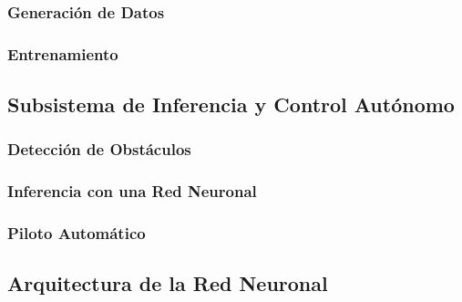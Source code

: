 \documentclass[]{beamer}
\begin{document}
            \subsubsection*{Generación de Datos}
            \begin{frame}
            \end{frame}

            \subsubsection*{Entrenamiento}
            \begin{frame}
            \end{frame}

        \subsection{Subsistema de Inferencia y Control Autónomo}
        \begin{frame}
        \end{frame}

            \subsubsection*{Detección de Obstáculos}
            \begin{frame}
            \end{frame}

            \subsubsection*{Inferencia con una Red Neuronal}
            \begin{frame}
            \end{frame}

            \subsubsection*{Piloto Automático}
            \begin{frame}
            \end{frame}


        \subsection{Arquitectura de la Red Neuronal}
\end{document}
